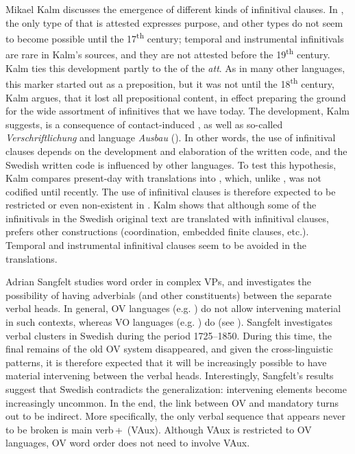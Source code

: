 \documentclass[output=paper]{langscibook}
\begin{document}
Mikael Kalm discusses the emergence of different kinds of  infinitival clauses. In , the only type of   that is attested expresses purpose, and other types do not seem to become possible until the 17\textsuperscript{th} century; temporal and instrumental  infinitivals are rare in Kalm’s sources, and they are not attested before the 19\textsuperscript{th} century. Kalm ties this development partly to the  of the  \textit{att}. As in many other  languages, this marker started out as a preposition, but it was not until the 18\textsuperscript{th} century, Kalm argues, that it lost all prepositional content, in effect preparing the ground for the wide assortment of  infinitives that we have today. The development, Kalm suggests, is a consequence of contact-induced , as well as so-called \textit{Verschriftlichung} and language \textit{Ausbau} (\citealt{Hoder2009, Hoder2010}). In other words, the use of  infinitival clauses depends on the development and elaboration of the written code, and the Swedish written code is influenced by other languages. To test this hypothesis, Kalm compares present-day  with translations into , which, unlike , was not codified until recently. The use of  infinitival clauses is therefore expected to be restricted or even non-existent in . Kalm shows that although some of the  infinitivals in the Swedish original text are translated with infinitival clauses,  prefers other constructions (coordination, embedded finite clauses, etc.). Temporal and instrumental infinitival clauses seem to be avoided in the  translations.



Adrian Sangfelt studies word order in complex VPs, and investigates the possibility of having adverbials (and other constituents) between the separate verbal heads. In general, OV languages (e.g. ) do not allow intervening material in such contexts, whereas VO languages (e.g. ) do (see \citealt{Haider2010,Haider2013}). Sangfelt investigates verbal clusters in Swedish during the period 1725–1850. During this time, the final remains of the old OV system disappeared, and given the cross-linguistic patterns, it is therefore expected that it will be increasingly possible to have material intervening between the verbal heads. Interestingly, Sangfelt’s results suggest that Swedish contradicts the generalization: intervening elements become increasingly uncommon. In the end, the link between OV and mandatory  turns out to be indirect. More specifically, the only verbal sequence that appears never to be broken is main verb\,+\, (VAux). Although VAux is restricted to OV languages, OV word order does not need to involve VAux.
\end{document}

